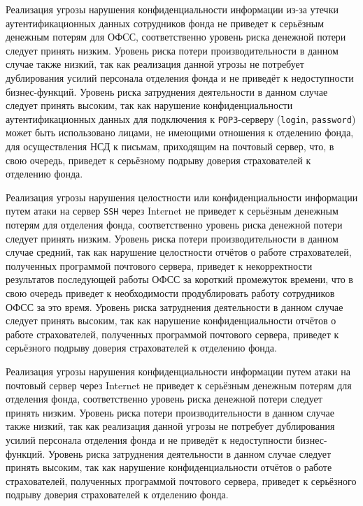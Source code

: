 \point Реализация угрозы нарушения конфиденциальности информации из-за
утечки аутентификационных данных сотрудников фонда не приведет к
серьёзным денежным потерям для ОФСС, соответственно уровень риска
денежной потери следует принять низким. Уровень риска потери
производительности в данном случае также низкий, так как реализация
данной угрозы не потребует дублирования усилий персонала отделения
фонда и не приведёт к недоступности бизнес-функций. Уровень риска
затруднения деятельности в данном случае следует принять высоким, так
как нарушение конфиденциальности аутентификационных данных для
подключения к \texttt{POP3}-серверу (\texttt{login},
\texttt{password}) может быть использовано лицами, не имеющими
отношения к отделению фонда, для осуществления НСД к письмам,
приходящим на почтовый сервер, что, в свою очередь, приведет к
серьёзному подрыву доверия страхователей к отделению фонда.

\point Реализация угрозы нарушения целостности или конфиденциальности
информации путем атаки на сервер \texttt{SSH} через Internet не
приведет к серьёзным денежным потерям для отделения фонда,
соответственно уровень риска денежной потери следует принять
низким. Уровень риска потери производительности в данном случае
средний, так как нарушение целостности отчётов о работе страхователей,
полученных программой почтового сервера, приведет к некорректности
результатов последующей работы ОФСС за короткий промежуток времени,
что в свою очередь приведет к необходимости продублировать работу
сотрудников ОФСС за это время. Уровень риска затруднения деятельности
в данном случае следует принять высоким, так как нарушение
конфиденциальности отчётов о работе страхователей, полученных
программой почтового сервера, приведет к серьёзного подрыву доверия
страхователей к отделению фонда.

\point Реализация угрозы нарушения конфиденциальности информации путем
атаки на почтовый сервер через Internet не приведет к серьёзным
денежным потерям для отделения фонда, соответственно уровень риска
денежной потери следует принять низким. Уровень риска потери
производительности в данном случае также низкий, так как реализация
данной угрозы не потребует дублирования усилий персонала отделения
фонда и не приведёт к недоступности бизнес-функций. Уровень риска
затруднения деятельности в данном случае следует принять высоким, так
как нарушение конфиденциальности отчётов о работе страхователей,
полученных программой почтового сервера, приведет к серьёзного подрыву
доверия страхователей к отделению фонда.


